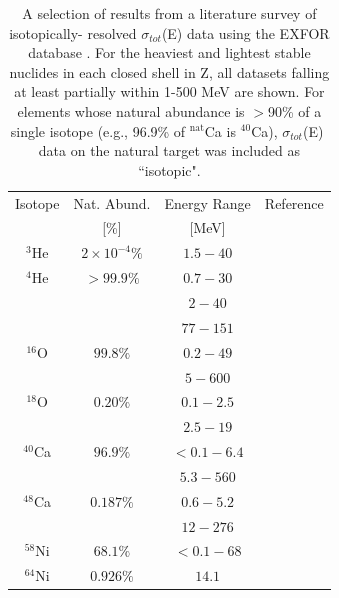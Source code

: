 \documentclass[twocolumn,secnumarabic,amssymb, nobibnotes, aps, prl,
superscriptaddress, nobalancelastpage]{revtex4}
\newcommand{\totEs}{\ensuremath{\sigma_{tot}}(E)\,\,}
\begin{document}
\begin{table}[ht]
    \caption{A selection of results from a literature survey of isotopically-
    resolved \totEs data using the EXFOR database \cite{EXFORDatabase}. For the
    heaviest and lightest stable nuclides in each closed shell in Z, all
    datasets falling at least partially within 1-500 MeV are shown. For elements
    whose natural abundance is $>$90\% of a single isotope (e.g.,
    96.9\% of $^{\text{nat}}$Ca is $^{40}$Ca), \totEs data on the natural
    target was included as ``isotopic".} \label{tab:title}
    \label{IsotopicCrossSectionTable}
    \begin{center}
        \begin{tabular}{ c c c c }
            \hline
            Isotope & Nat. Abund. & Energy Range & Reference\\
                    & [\%] & [MeV] & \\

            \hline

            $^{3}$He & $2\times 10^{-4}\%$ & $1.5 - 40$ & \cite{Haesner1983}\\
            $^{4}$He & $>99.9\%$ & $0.7-30$ & \cite{Goulding1973}\\
            & & $2-40$ & \cite{Haesner1983}\\
            & & $77-151$ & \cite{Measday1966}\\

            $^{16}$O & $99.8\%$ & $0.2-49$ & \cite{Perey1972}\\
            & & $5-600$ & \cite{Finlay1993}\\

            $^{18}$O & $0.20\%$ & $0.1-2.5$ & \cite{Vaughn1965}\\
            & & $2.5-19$ & \cite{Salisbury1965}\\

            $^{40}$Ca & $96.9\%$ & $<0.1-6.4$ & \cite{Johnson1973}\\
            & & $5.3-560$ & \cite{Abfalterer2001}\\

            $^{48}$Ca & $0.187\%$ & $0.6-5.2$ & \cite{Harvey1985}\\
            & & $12-276$ & \cite{Shane2010}\\

            $^{58}$Ni & $68.1\%$ & $<0.1-68$ & \cite{Perey1993}\\

            $^{64}$Ni & $0.926\%$ & $14.1$ & \cite{Dukarevich1967}\\


\end{tabular}
\end{center}
\end{table}
\end{document}
